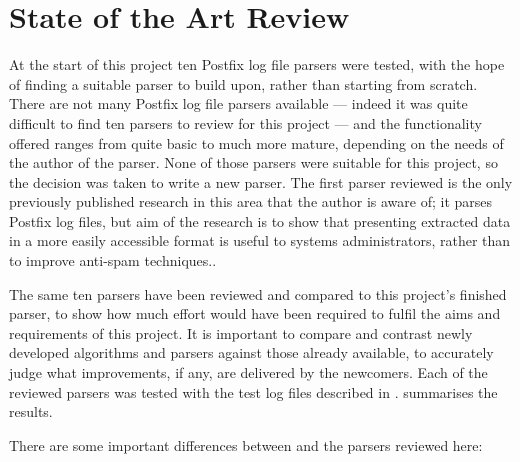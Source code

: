 \chapter{State of the Art Review}

\label{state of the art review}

At the start of this project ten Postfix log file parsers were tested, with
the hope of finding a suitable parser to build upon, rather than starting
from scratch.  There are not many Postfix log file parsers available ---
indeed it was quite difficult to find ten parsers to review for this
project --- and the functionality offered ranges from quite basic to much
more mature, depending on the needs of the author of the parser.  None of
those parsers were suitable for this project, so the decision was taken to
write a new parser.  The first parser reviewed is the only previously
published research in this area that the author is aware of; it parses
Postfix log files, but aim of the research is to show that presenting
extracted data in a more easily accessible format is useful to systems
administrators, rather than to improve anti-spam techniques..

The same ten parsers have been reviewed and compared to this project's
finished parser, to show how much effort would have been required to fulfil
the aims and requirements of this project.  It is important to compare and
contrast newly developed algorithms and parsers against those already
available, to accurately judge what improvements, if any, are delivered by
the newcomers.  Each of the reviewed parsers was tested with the
\numberOFlogFILES{} test log files described in .   summarises the
results.

There are some important differences between \parsername{} and the parsers
reviewed here:

